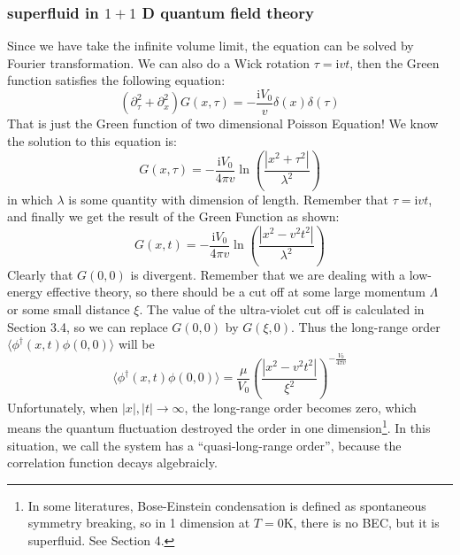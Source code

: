\documentclass{article}
\newcommand{\im}{\mathrm{i}}
\begin{document}
\subsubsection{superfluid in $1+1$ D quantum field theory}
Since we have take the infinite volume limit, the equation can be solved by Fourier transformation. We can also do a Wick rotation $\tau = \im v t$, then the Green function satisfies the following equation:
\begin{equation}
(\partial_\tau^2+\partial_x^2)G(x,\tau) = -\frac{\im V_0}{v}\delta(x)\delta(\tau)
\end{equation}
That is just the Green function of two dimensional Poisson Equation! We know the solution to this equation is:
\begin{equation}
G(x,\tau) = -\frac{\im V_0}{4\pi v}\ln\left(\frac{|x^2 + \tau^2|}{\lambda^2}\right)
\end{equation}
in which $\lambda$ is some quantity with dimension of length. Remember that $\tau = \im vt$, and finally we get the result of the Green Function as shown:
\begin{equation}
G(x,t) = -\frac{\im V_0}{4\pi v}\ln{\left(\frac{|x^2-v^2t^2|}{\lambda^2}\right)}
\end{equation}
Clearly that $G(0,0)$ is divergent. Remember that we are dealing with a low-energy effective theory, so there should be a cut off at some large momentum $\Lambda$ or some small distance $\xi$. The value of the ultra-violet cut off is calculated in Section 3.4, so we can replace $G(0,0)$ by $G(\xi,0)$. Thus the long-range order $\langle \phi^\dagger(x,t)\phi(0,0)\rangle$ will be
\begin{equation}
\langle \phi^\dagger(x,t)\phi(0,0)\rangle =\frac{\mu}{V_0}\left(\frac{|x^2 -v^2t^2|}{\xi^2}\right)^{-\frac{V_0}{4\pi v}}
\end{equation}
Unfortunately, when $|x|,|t|\rightarrow \infty$, the long-range order becomes zero, which means the quantum fluctuation destroyed the order in one dimension\footnote{In some literatures, Bose-Einstein condensation is defined as spontaneous symmetry breaking, so in 1 dimension at $T=0\mathrm{K}$, there is no BEC, but it is superfluid. See Section 4.}. In this situation, we call the system has a ``quasi-long-range order'', because the correlation function decays algebraicly.
\end{document}
